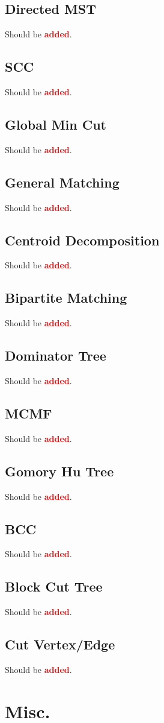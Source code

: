 \documentclass[landscape, 8pt, a4paper, oneside, twocolumn]{extarticle}
\newcommand{\added}{Should be \textcolor{red}{\textbf{added}}.}
\begin{document}
\subsection{Directed MST}
\added
\subsection{SCC}
\added
\subsection{Global Min Cut}
\added
\subsection{General Matching}
\added
\subsection{Centroid Decomposition}
\added
\subsection{Bipartite Matching}
\added
\subsection{Dominator Tree}
\added
\subsection{MCMF}
\added
\subsection{Gomory Hu Tree}
\added
\subsection{BCC}
\added
\subsection{Block Cut Tree}
\added
\subsection{Cut Vertex/Edge}
\added

\section{Misc.}
\end{document}
